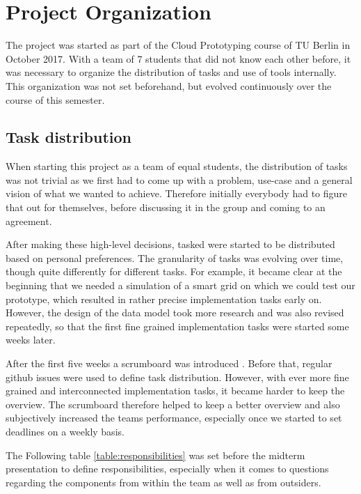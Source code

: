 \section{Project Organization}

The project was started as part of the Cloud Prototyping course of TU Berlin in October 2017. 
With a team of 7 students that did not know each other before, it was necessary to organize the distribution of tasks and use of tools internally. 
This organization was not set beforehand, but evolved continuously over the course of this semester.

\subsection{Task distribution}

When starting this project as a team of equal students, the distribution of tasks was not trivial as we first had to come up with a problem, use-case and a general vision of what we wanted to achieve. 
Therefore initially everybody had to figure that out for themselves, before discussing it in the group and coming to an agreement.

After making these high-level decisions, tasked were started to be distributed based on personal preferences. 
The granularity of tasks was evolving over time, though quite differently for different tasks.
For example, it became clear at the beginning that we needed a simulation of a smart grid on which we could test our prototype, which resulted in rather precise implementation tasks early on. 
However, the design of the data model took more research and was also revised repeatedly, so that the first fine grained implementation tasks were started some weeks later.

After the first five weeks a scrumboard was introduced \cite{zenhub}. 
Before that, regular github issues were used to define task distribution. 
However, with ever more fine grained and interconnected implementation tasks, it became harder to keep the overview. 
The scrumboard therefore helped to keep a better overview and also subjectively increased the teams performance, especially once we started to set deadlines on a weekly basis.

The Following table \ref{table:responsibilities} was set before the midterm presentation to define responsibilities, especially when it comes to questions regarding the components from within the team as well as from outsiders.


